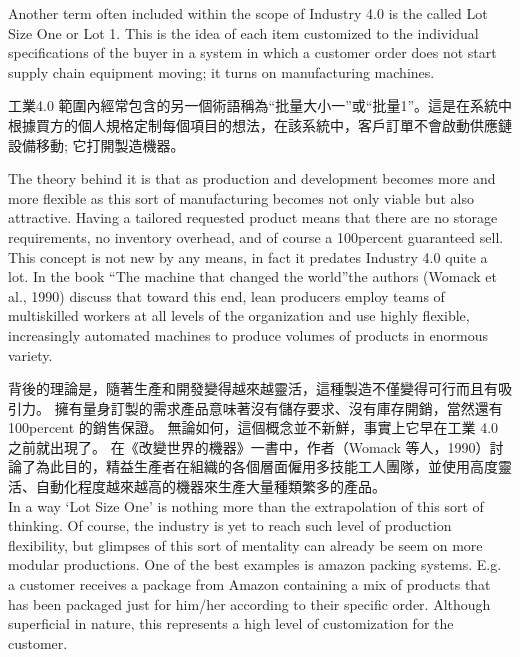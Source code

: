 \fontsize{14pt}{2.5pt}\sectionef 
{Another term often included within the scope of Industry 4.0 is the called Lot Size One or Lot 1. This is the idea of each item customized to the individual specifications of the buyer in a system in which a customer order does not start supply chain equipment moving; it turns on manufacturing machines.}

\fontsize{14pt}{5pt}\sectionef
 {工業4.0 範圍內經常包含的另一個術語稱為“批量大小一”或“批量1”。這是在系統中根據買方的個人規格定制每個項目的想法，在該系統中，客戶訂單不會啟動供應鏈設備移動; 它打開製造機器。}\\[15pt]
\newpage

\fontsize{14pt}{2.5pt}\sectionef 
{The theory behind it is that as production and development becomes more and more flexible as this sort of manufacturing becomes not only viable but also attractive. Having a tailored requested product means that there are no storage requirements, no inventory overhead, and of course a 100percent guaranteed sell. This concept is not new by any means, in fact it predates Industry 4.0 quite a lot. In the book “The machine that changed the world”the authors (Womack et al., 1990) discuss that toward this end, lean producers employ teams of multiskilled workers at all levels of the organization and use highly flexible, increasingly automated machines to produce volumes of products in enormous variety.}

\fontsize{14pt}{5pt}\sectionef
 {背後的理論是，隨著生產和開發變得越來越靈活，這種製造不僅變得可行而且有吸引力。 擁有量身訂製的需求產品意味著沒有儲存要求、沒有庫存開銷，當然還有 100percent 的銷售保證。 無論如何，這個概念並不新鮮，事實上它早在工業 4.0 之前就出現了。 在《改變世界的機器》一書中，作者（Womack 等人，1990）討論了為此目的，精益生產者在組織的各個層面僱用多技能工人團隊，並使用高度靈活、自動化程度越來越高的機器來生產大量種類繁多的產品。}\\[15pt]

\fontsize{14pt}{2.5pt}\sectionef 
{In a way ‘Lot Size One’ is nothing more than the extrapolation of this sort of thinking. Of course, the industry is yet to reach such level of production flexibility, but glimpses of this sort of mentality can already be seem on more modular productions. One of the best examples is amazon packing systems. E.g. a customer receives a package from Amazon containing a mix of products that has been packaged just for him/her according to their specific order. Although superficial in nature, this represents a high level of customization for the customer. }

